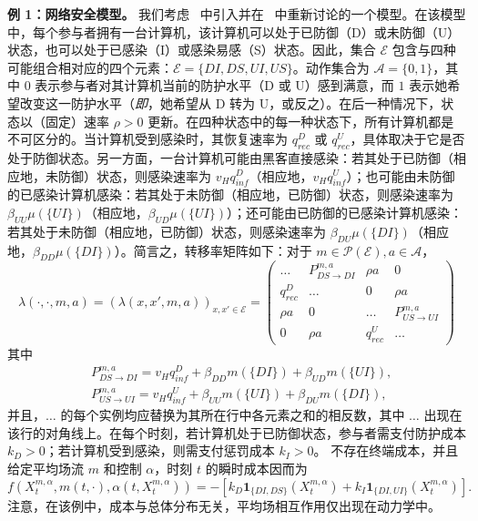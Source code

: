 \documentclass{amsproc}
\theoremstyle{definition}
\theoremstyle{remark}
\numberwithin{equation}{section}
\newcommand{\cA}{{\mathcal A}}
\newcommand{\cE}{{\mathcal E}}
\newcommand{\cP}{{\mathcal P}}
\newcommand{\ctrl}{\alpha}
\newcommand{\indic}{\mathbf{1}}
\begin{document}
 



\textbf{例 1：网络安全模型。} 我们考虑~\cite{MR3575619} 中引入并在~\cite[Section 7.2.3]{MR3752669} 中重新讨论的一个模型。在该模型中，每个参与者拥有一台计算机，该计算机可以处于已防御（D）或未防御（U）状态，也可以处于已感染（I）或感染易感（S）状态。因此，集合 $\cE$ 包含与四种可能组合相对应的四个元素：$\cE = \{DI, DS, UI, US\}$。动作集合为 $\cA = \{0,1\}$，其中 $0$ 表示参与者对其计算机当前的防护水平（D 或 U）感到满意，而 $1$ 表示她希望改变这一防护水平（\textit{即}，她希望从 D 转为 U，或反之）。在后一种情况下，状态以（固定）速率 $\rho >0$ 更新。在四种状态中的每一种状态下，所有计算机都是不可区分的。当计算机受到感染时，其恢复速率为 $q_{rec}^D$ 或 $q_{rec}^U$，具体取决于它是否处于防御状态。另一方面，一台计算机可能由黑客直接感染：若其处于已防御（相应地，未防御）状态，则感染速率为 $v_H q_{inf}^D$（相应地，$v_H q_{inf}^U$）；也可能由未防御的已感染计算机感染：若其处于未防御（相应地，已防御）状态，则感染速率为 $\beta_{UU}\mu(\{UI\})$（相应地，$\beta_{UD}\mu(\{UI\})$）；还可能由已防御的已感染计算机感染：若其处于未防御（相应地，已防御）状态，则感染速率为 $\beta_{DU}\mu(\{DI\})$（相应地，$\beta_{DD}\mu(\{DI\})$）。简言之，转移率矩阵如下：对于 $m \in \cP(\cE), a \in \cA$，
$$
	\lambda(\cdot, \cdot, m, a) 
	= \left( \lambda(x, x', m, a) \right)_{x,x' \in \cE}
	= \begin{pmatrix}
	\dots 	& 		P^{m,a}_{DS \rightarrow DI}	&	 \rho a 	&	0
	\\
	q_{rec}^D 	& 	\dots 		&	 0	&	\rho a
	\\
	\rho a 	& 	0 		&	 \dots	&	P^{m,a}_{US \rightarrow UI}
	\\
	0	&	\rho a	&	q_{rec}^U	& \dots
	\end{pmatrix}
$$
其中
\begin{align*}
	&P^{m,a}_{DS \rightarrow DI} = v_H q_{inf}^D + \beta_{DD} m(\{DI\})  + \beta_{UD} m(\{UI\}) ,
	\\
	&P^{m,a}_{US \rightarrow UI} = v_H q_{inf}^U + \beta_{UU} m(\{UI\}) + \beta_{DU} m(\{DI\}),
\end{align*}
并且，$\dots$ 的每个实例均应替换为其所在行中各元素之和的相反数，其中 $\dots$ 出现在该行的对角线上。在每个时刻，若计算机处于已防御状态，参与者需支付防护成本 $k_D>0$；若计算机受到感染，则需支付惩罚成本 $k_I>0$。
不存在终端成本，并且给定平均场流 $m$ 和控制 $\ctrl$，时刻 $t$ 的瞬时成本因而为
$$
	f(X^{m,\ctrl}_t, m(t,\cdot), \ctrl(t, X^{m,\ctrl}_t)) = -\left[ k_D \indic_{\{DI, DS\}}(X^{m,\ctrl}_t) + k_I \indic_{\{DI, UI\}}(X^{m,\ctrl}_t)\right].
$$
注意，在该例中，成本与总体分布无关，平均场相互作用仅出现在动力学中。
\end{document}
